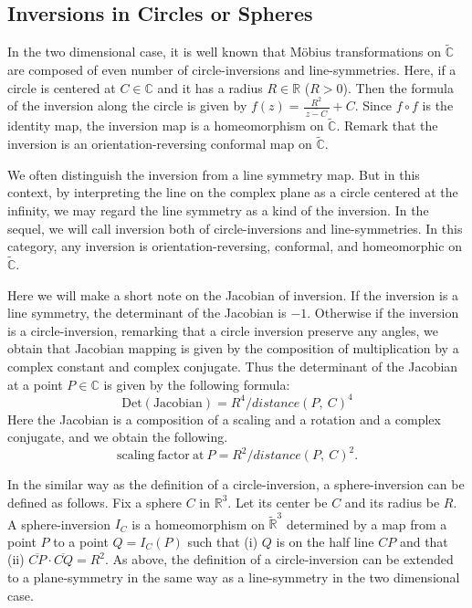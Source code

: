 \subsection{Inversions in Circles or Spheres}

In the two dimensional case, it is well known that M\"obius transformations on $\tilde{\mathbb{C}}$
are composed of even number of circle-inversions and line-symmetries.
Here, if a circle is centered at $C\in\mathbb{C}$ and it has a radius $R\in\mathbb{R}$ ($R>0$).
Then the formula of the inversion along the circle is given by
$f(z) = \frac{R^2}{~\overline{z -C}~} + C$.
Since $f \circ f$ is the identity map, the inversion map is a homeomorphism on $\tilde{\mathbb{C}}$.
Remark that the inversion is an orientation-reversing conformal map on $\tilde{\mathbb{C}}$.

We often distinguish the inversion from a line symmetry map.
But in this context, by interpreting the line on the complex plane as a circle centered at the infinity, 
we may regard the line symmetry as a kind of the inversion. 
In the sequel, we will call inversion both of circle-inversions and line-symmetries.
In this category, any inversion is orientation-reversing, conformal,
and homeomorphic on $\tilde{\mathbb{C}}$.

Here we will make a short note on the Jacobian of inversion.
If the inversion is a line symmetry, the determinant of the Jacobian is $-1$.
Otherwise if the inversion is a circle-inversion, remarking that a circle inversion
preserve any angles, we obtain that Jacobian mapping is given by the composition of multiplication by a complex constant
and complex conjugate.
Thus the determinant of the Jacobian at a point $P\in\mathbb{C}$ is given by the following formula:
\[ \mathrm{Det}(\mathrm{Jacobian}) = R^4 / distance(P,~C)^4 \]%
Here the Jacobian is a composition of a scaling and a rotation and a complex conjugate, and we obtain the following.
\[ \mathrm{scaling~factor~at~} P  = R^2 / distance(P,~C)^2. \]

In the similar way as the definition of a circle-inversion,
a sphere-inversion can be defined as follows.
Fix a sphere $C$ in $\mathbb{R}^3$.  Let its center be $C$ and its radius be $R$. 
A sphere-inversion $I_C$ is a homeomorphism on $\tilde{\mathbb{R}}^3$ 
determined by a map from a point $P$ to a point $Q = I_C(P)$ such that (i) $Q$ is on the half line $CP$ and 
that (ii) $\overline{CP}\cdot \overline{CQ} = R^2$.
As above, the definition of a circle-inversion can be extended to a plane-symmetry
in the same way as a line-symmetry in the two dimensional case.

